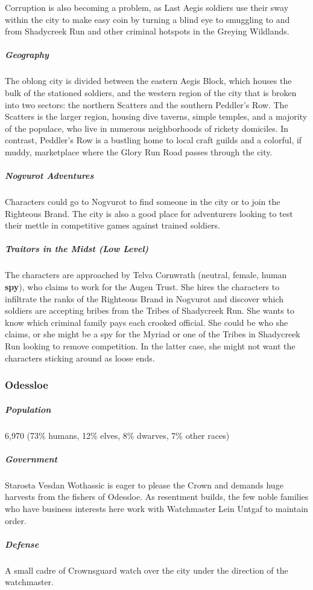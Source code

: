 \documentclass[10pt,a4paper,twoside,bg=print,twocolumn,openany,nodeprecatedcode]{dndbook}
\begin{document}
Corruption is also becoming a problem, as Last Aegis soldiers use their sway within the city to make easy coin by turning a blind eye to smuggling to and from Shadycreek Run and other criminal hotspots in the Greying Wildlands.

\subparagraph{Geography}
The oblong city is divided between the eastern Aegis Block, which houses the bulk of the stationed soldiers, and the western region of the city that is broken into two sectors: the northern Scatters and the southern Peddler's Row. The Scatters is the larger region, housing dive taverns, simple temples, and a majority of the populace, who live in numerous neighborhoods of rickety domiciles. In contrast, Peddler's Row is a bustling home to local craft guilds and a colorful, if muddy, marketplace where the Glory Run Road passes through the city.

\subparagraph{Nogvurot Adventures}
Characters could go to Nogvurot to find someone in the city or to join the Righteous Brand. The city is also a good place for adventurers looking to test their mettle in competitive games against trained soldiers.

\subparagraph{Traitors in the Midst (Low Level)}
The characters are approached by Telva Cornwrath (neutral, female, human \textbf{spy}), who claims to work for the Augen Trust. She hires the characters to infiltrate the ranks of the Righteous Brand in Nogvurot and discover which soldiers are accepting bribes from the Tribes of Shadycreek Run. She wants to know which criminal family pays each crooked official. She could be who she claims, or she might be a spy for the Myriad or one of the Tribes in Shadycreek Run looking to remove competition. In the latter case, she might not want the characters sticking around as loose ends.

\subsubsection{Odessloe}
\subparagraph{Population}
6,970 (73\% humans, 12\% elves, 8\% dwarves, 7\% other races)

\subparagraph{Government}
Starosta Vesdan Wothassic is eager to please the Crown and demands huge harvests from the fishers of Odessloe. As resentment builds, the few noble families who have business interests here work with Watchmaster Lein Untgaf to maintain order.

\subparagraph{Defense}
A small cadre of Crownsguard watch over the city under the direction of the watchmaster.
\end{document}
